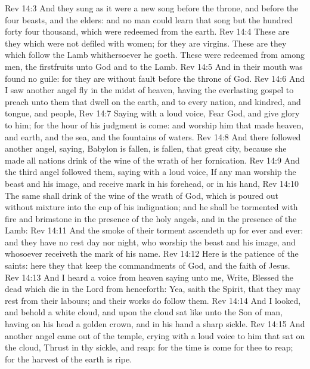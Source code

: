 \vs Rev 14:3 And they sung as it were a new song before the throne, and before the four beasts, and the elders: and no man could learn that song but the hundred  forty  four thousand, which were redeemed from the earth.
\vs Rev 14:4 These are they which were not defiled with women; for they are virgins. These are they which follow the Lamb whithersoever he goeth. These were redeemed from among men,  the firstfruits unto God and to the Lamb.
\vs Rev 14:5 And in their mouth was found no guile: for they are without fault before the throne of God.
\vs Rev 14:6 And I saw another angel fly in the midst of heaven, having the everlasting gospel to preach unto them that dwell on the earth, and to every nation, and kindred, and tongue, and people,
\vs Rev 14:7 Saying with a loud voice, Fear God, and give glory to him; for the hour of his judgment is come: and worship him that made heaven, and earth, and the sea, and the fountains of waters.
\vs Rev 14:8 And there followed another angel, saying, Babylon is fallen, is fallen, that great city, because she made all nations drink of the wine of the wrath of her fornication.
\vs Rev 14:9 And the third angel followed them, saying with a loud voice, If any man worship the beast and his image, and receive  mark in his forehead, or in his hand,
\vs Rev 14:10 The same shall drink of the wine of the wrath of God, which is poured out without mixture into the cup of his indignation; and he shall be tormented with fire and brimstone in the presence of the holy angels, and in the presence of the Lamb:
\vs Rev 14:11 And the smoke of their torment ascendeth up for ever and ever: and they have no rest day nor night, who worship the beast and his image, and whosoever receiveth the mark of his name.
\vs Rev 14:12 Here is the patience of the saints: here  they that keep the commandments of God, and the faith of Jesus.
\vs Rev 14:13 And I heard a voice from heaven saying unto me, Write, Blessed  the dead which die in the Lord from henceforth: Yea, saith the Spirit, that they may rest from their labours; and their works do follow them.
\vs Rev 14:14 And I looked, and behold a white cloud, and upon the cloud  sat like unto the Son of man, having on his head a golden crown, and in his hand a sharp sickle.
\vs Rev 14:15 And another angel came out of the temple, crying with a loud voice to him that sat on the cloud, Thrust in thy sickle, and reap: for the time is come for thee to reap; for the harvest of the earth is ripe.
